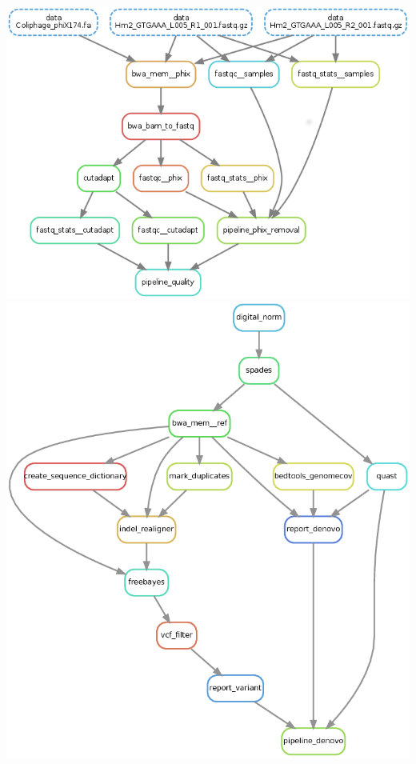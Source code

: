 \documentclass{beamer}
\begin{document}
\begin{frame}[fragile]
    \begin{minipage}{100pc}
            \includegraphics[scale=0.30]{images/quality_dag.png}
            \includegraphics[scale=0.15]{images/denovo_dag.png}
    \end{minipage}

\end{frame}
\end{document}
